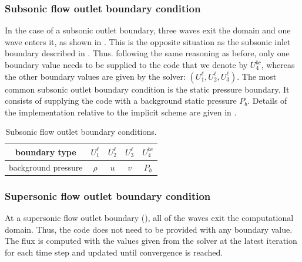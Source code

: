 \subsubsection{Subsonic flow outlet boundary condition} \label{sec:sub-flow-outlet-bc}
In the case of a subsonic outlet boundary, three waves exit the domain and one wave enters it, as shown in . This is the opposite situation as the subsonic inlet boundary described in . Thus. following the same reasoning as before, only one boundary value needs to be supplied to the code that we denote by $U_4^{bc}$, whereas the other boundary values are given by the solver: $\left(U_1^{\ell}, U_2^{\ell}, U_3^{\ell}\right)$. The most common subsonic outlet boundary condition is the static pressure boundary. It consists of supplying the code with a background static pressure $P_b$. Details of the implementation relative to the implicit scheme are given in . 
%
\begin{table}[!htbp]
\begin{center}
\caption{ Subsonic flow outlet boundary conditions.}
\label{tbl:sub-outlet-flow-bc}
\begin{tabular}{|c|c|c|c|c|}
 \hline
boundary type & $U_1^{\ell}$  & $U_2^{\ell}$ & $U_3^{\ell}$ & $U_4^{bc}$ \\  \hline
background pressure & $\rho$     & $u$    & $v$  & $P_b$     \\  \hline
\end{tabular}
\end{center}
\end{table}
\subsubsection{Supersonic flow outlet boundary condition} \label{sec:sup-flow-outlet-bc}
At a supersonic flow outlet boundary (), all of the waves exit the computational domain. Thus, the code does not need to be provided with any boundary value. The flux is computed with the values given from the solver at the latest iteration for each time step and updated until convergence is reached. 
